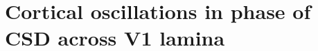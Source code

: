 \chapter{Cortical oscillations in phase of CSD across V1 lamina}

\graphicspath{{Chapters/laminar-phase/figs/}}

